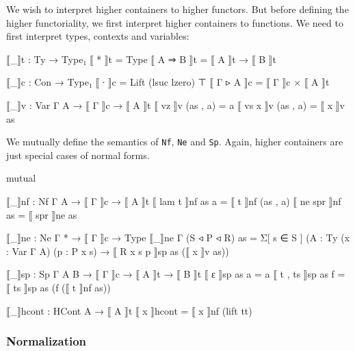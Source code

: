 We wish to interpret higher containers to higher functors. But before defining the higher functoriality, we first interpret higher containers to functions. We need to first interpret types, contexts and variables:

\begin{code}
⟦_⟧t : Ty → Type₁
⟦ * ⟧t = Type
⟦ A ⇒ B ⟧t = ⟦ A ⟧t → ⟦ B ⟧t

⟦_⟧c : Con → Type₁
⟦ ∙ ⟧c = Lift (lsuc lzero) ⊤
⟦ Γ ▹ A ⟧c = ⟦ Γ ⟧c × ⟦ A ⟧t

⟦_⟧v : Var Γ A → ⟦ Γ ⟧c → ⟦ A ⟧t
⟦ vz ⟧v (as , a) = a
⟦ vs x ⟧v (as , a) = ⟦ x ⟧v as
\end{code}

We mutually define the semantics of \texttt{Nf}, \texttt{Ne} and \texttt{Sp}. Again, higher containers are just special cases of normal forms.

\begin{code}[hide]
mutual
\end{code}

\begin{code}
  ⟦_⟧nf : Nf Γ A → ⟦ Γ ⟧c → ⟦ A ⟧t
  ⟦ lam t ⟧nf as a = ⟦ t ⟧nf (as , a)
  ⟦ ne spr ⟧nf as = ⟦ spr ⟧ne as

  ⟦_⟧ne : Ne Γ * → ⟦ Γ ⟧c → Type
  ⟦_⟧ne {Γ} (S ◃ P ◃ R) as =
    Σ[ s ∈ S ] ({A : Ty} (x : Var Γ A) (p : P x s)
      → ⟦ R x s p ⟧sp as (⟦ x ⟧v as))

  ⟦_⟧sp : Sp Γ A B → ⟦ Γ ⟧c → ⟦ A ⟧t → ⟦ B ⟧t
  ⟦ ε ⟧sp as a = a
  ⟦ t , ts ⟧sp as f = ⟦ ts ⟧sp as (f (⟦ t ⟧nf as))
\end{code}

\begin{code}
⟦_⟧hcont : HCont A → ⟦ A ⟧t
⟦ x ⟧hcont = ⟦ x ⟧nf (lift tt)
\end{code}

\subsubsection{Normalization}


